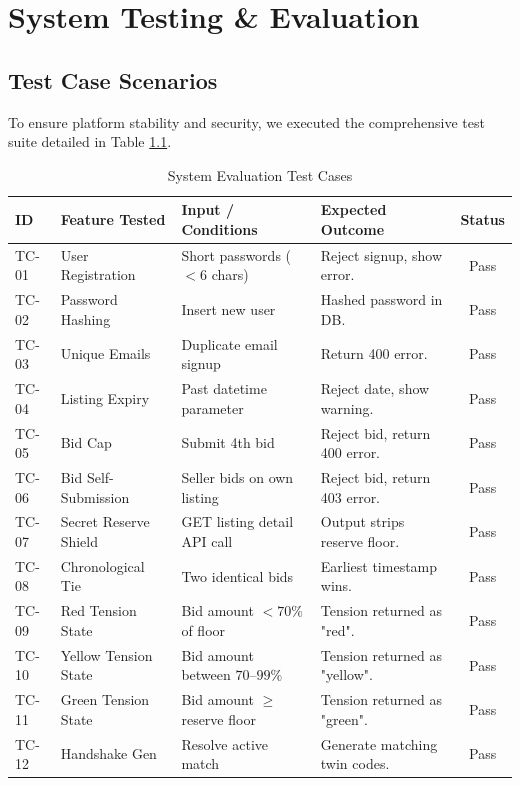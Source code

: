 \documentclass[12pt,a4paper,oneside]{report}
\begin{document}
\chapter{System Testing \& Evaluation}

\section{Test Case Scenarios}
To ensure platform stability and security, we executed the comprehensive test suite detailed in Table \ref{tab:test_cases}.

\begin{table}[H]
\centering
\caption{System Evaluation Test Cases}
\label{tab:test_cases}
\small
\begin{tabular}{lp{3.5cm}p{4cm}p{4cm}c}
\toprule
\textbf{ID} & \textbf{Feature Tested} & \textbf{Input / Conditions} & \textbf{Expected Outcome} & \textbf{Status} \\
\midrule
TC-01 & User Registration & Short passwords ($<6$ chars) & Reject signup, show error. & Pass \\
TC-02 & Password Hashing & Insert new user & Hashed password in DB. & Pass \\
TC-03 & Unique Emails & Duplicate email signup & Return 400 error. & Pass \\
TC-04 & Listing Expiry & Past datetime parameter & Reject date, show warning. & Pass \\
TC-05 & Bid Cap & Submit 4th bid & Reject bid, return 400 error. & Pass \\
TC-06 & Bid Self-Submission & Seller bids on own listing & Reject bid, return 403 error. & Pass \\
TC-07 & Secret Reserve Shield & GET listing detail API call & Output strips reserve floor. & Pass \\
TC-08 & Chronological Tie & Two identical bids & Earliest timestamp wins. & Pass \\
TC-09 & Red Tension State & Bid amount $<70\%$ of floor & Tension returned as "red". & Pass \\
TC-10 & Yellow Tension State & Bid amount between $70$--$99\%$ & Tension returned as "yellow". & Pass \\
TC-11 & Green Tension State & Bid amount $\ge$ reserve floor & Tension returned as "green". & Pass \\
TC-12 & Handshake Gen & Resolve active match & Generate matching twin codes. & Pass \\

\end{tabular}
\end{table}
\end{document}
